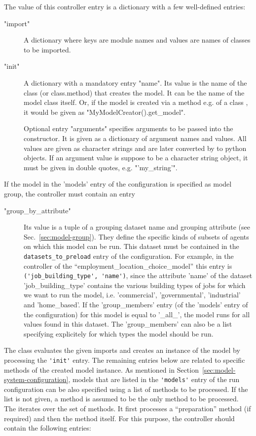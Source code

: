 The value of this controller entry is a dictionary with a few well-defined entries:
\begin{description}
\item["import"] A dictionary where keys are module names and values are names
  of classes to be imported.
\item["init"] A dictionary with a mandatory entry "name". Its value is the
  name of the class (or class.method) that creates the model. It can be the
  name of the model class itself.  Or, if the model is created via   a
  method e.g.  of a class , it would be
  given as "MyModelCreator().get_model".

  Optional entry "arguments" specifies arguments to be passed into the
  constructor. It is given as a dictionary of argument names and values. All
  values are given as character strings and are later converted by
   to python objects. If an argument value is suppose to be
  a character string object, it must be given in double quotes, e.g.
  "'my_string'".
\end{description}
If the model in the 'models' entry of the configuration is specified as model group, the controller must contain 
an entry
\begin{description}
\item["group_by_attribute"] Its value is a tuple of a grouping dataset name and grouping attribute (see Sec.~\ref{sec:model-group}).
They define the specific kinds of 
subsets of agents on which this model can be run. This dataset must be contained in the 
\verb|datasets_to_preload| entry of the configuration. For example, in the controller of the 
``employment_location_choice_model'' this entry is
\verb|('job_building_type', 'name')|, since the attribute 'name' of the dataset 'job_building_type' contains the various
building types of jobs for which we want to run the model, i.e. 'commercial', 'governmental', 'industrial' and 'home_based'.
If the 'group_members' entry (of the 'models' entry of the configuration) for this model is equal to '_all_', the model runs 
for all values found in this dataset. The  'group_members' can also be a list specifying explicitely for which types the model 
should be run. 
\end{description}

The  class evaluates the given imports and creates an
instance of the model by processing the \verb|'init'| entry. The remaining entries
below are related to specific methods of the created model instance.  As
mentioned in Section~\ref{sec:model-system-configuration}, models 
that are listed in the \verb|'models'| entry of the run configuration can be also
specified using a list of methods to be processed. If the list is not given, a
method  is assumed to be the only method to be processed. The
 iterates over the set of methods. It first processes a
``preparation'' method (if required) and then the method itself. For this purpose,
the controller should contain the following entries:

